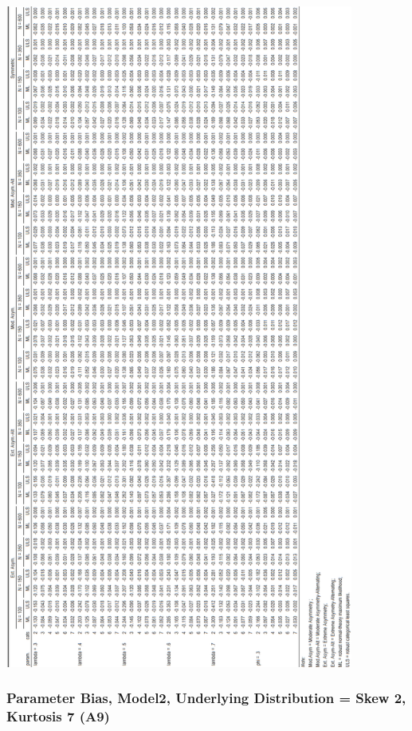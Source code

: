 \documentclass[10,a4paperpaper,]{article}
\begin{document}
\includegraphics[width=325pt]{./figures/tabA8}

\subsubsection{Parameter Bias, Model2, Underlying Distribution = Skew 2, Kurtosis 7 (A9)}
\end{document}
